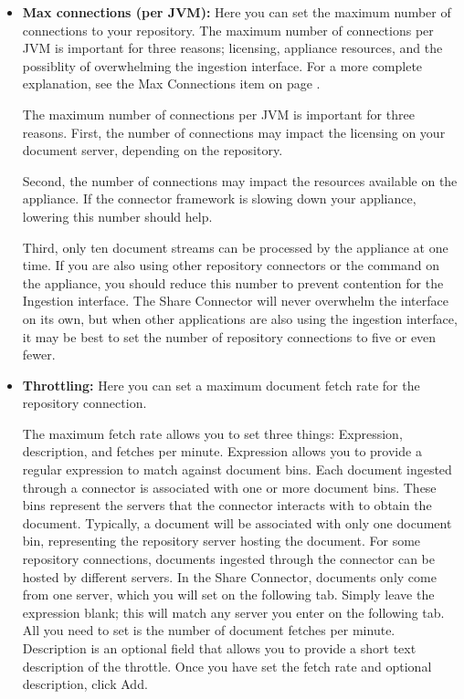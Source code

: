 \begin{itemize}

\item \textbf{Max connections (per JVM):} Here you can set the maximum
number of connections to your repository.  \ifCombinedConnectorGuide
The maximum number of connections per JVM is important for three
reasons; licensing, appliance resources, and the possiblity of
overwhelming the ingestion interface. For a more complete explanation,
see the Max Connections item on page \pageref{maxrepocon}.\fi

\ifShareGuide
The maximum number of connections per JVM is important for three reasons.
First, the number of connections may impact the licensing on your document
server, depending on the repository.

Second, the number of connections may impact the resources
available on the appliance. If the connector framework is slowing down
your appliance, lowering this number should help.

Third, only ten document streams can be processed by the appliance
at one time.  If you are also using other repository connectors or
the  command on the appliance, you should reduce this
number to prevent contention for the Ingestion interface. The Share
Connector will never overwhelm the interface on its own, but when other
applications are also using the ingestion interface, it may be best to
set the number of repository connections to five or even fewer.
\fi

\item \textbf{Throttling:} Here you can set a maximum document fetch
rate for the repository connection.


The maximum fetch rate allows you to set three things: Expression,
description, and fetches per minute. Expression allows you to provide
a regular expression to match against document bins.  Each document
ingested through a connector is associated with one or more document
bins. These bins represent the servers that the connector interacts
with to obtain the document.  Typically, a document will be associated
with only one document bin, representing the repository server hosting
the document. For some repository connections, documents ingested
through the connector can be hosted by different servers. In the Share
Connector, documents only come from one server, which you will set on
the following tab. Simply leave the expression blank; this will match
any server you enter on the following tab.  All you need to set is the
number of document fetches per minute.  Description is an optional
field that allows you to provide a short text description of the
throttle.  Once you have set the fetch rate and optional description,
click Add.




\end{itemize}

